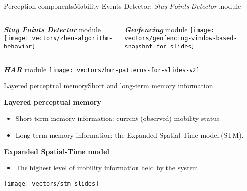 \begin{frame}{Perception components}{Mobility Events Detector: \emph{Stay Points Detector} module}
\small
\vspace{-0.3cm}
\begin{columns}
\begin{column}[T]{0.5\textwidth}
\begin{block}{\small \emph{\textbf{Stay Points Detector}} module}
{
  \centering
  \texttt{[image: vectors/zhen-algorithm-behavior]}
}
\end{block}
\end{column}

\begin{column}[T]{0.5\textwidth}
\begin{block}{\small \emph{\textbf{Geofencing}} module}
{
  \centering
  \texttt{[image: vectors/geofencing-window-based-snapshot-for-slides]}
}
\end{block}
\end{column}
\end{columns}

\begin{block}{\small \emph{\textbf{HAR}} module}
{
  \centering
  \texttt{[image: vectors/har-patterns-for-slides-v2]}
}
\end{block}
\end{frame}


\begin{frame}{Layered perceptual memory}{Short and long-term memory information}
\vspace{-0.25cm}
\small
\begin{block}{\small \textbf{Layered perceptual memory}}
\begin{itemize}
    \item Short-term memory information: current (observed) mobility status.
    \item Long-term memory information: the Expanded Spatial-Time model (STM).
\end{itemize}
\end{block}

\begin{block}{\small \textbf{Expanded Spatial-Time model}}
\begin{itemize}
  \item The highest level of mobility information held by the system.
\end{itemize}
{
  \centering
  \texttt{[image: vectors/stm-slides]}
\par }
\end{block}
\end{frame}

